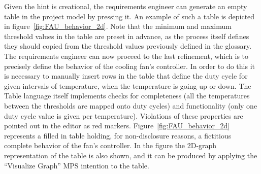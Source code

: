 Given the hint is creational, the requirements engineer can generate an empty
table in the project model by pressing it. An example of such a table is
depicted in figure~\ref{fig:FAU_behavior_2d}.
Note that the minimum and maximum threshold values in the table are preset in
advance, as the process itself defines they should copied from the threshold values previously defined in the glossary.
The requirements engineer can now proceed to the last refinement, which is to
precisely define the behavior of the cooling fan's controller. In order to do
this it is necessary to manually insert rows in the table that define the duty cycle for
given intervals of temperature, when the temperature is going up or down. 
The \textsf{Table} language itself implements checks for completeness (all the
temperatures between the thresholds are mapped onto duty cycles) and
functionality (only one duty cycle value is given per temperature). Violations
of these properties are pointed out in the editor as red markers.
Figure~\ref{fig:FAU_behavior_2d} represents a filled in table holding, for
non-disclosure reasons, a fictitious complete behavior of the fan's controller.
In the figure the 2D-graph representation of the table is also shown, and it can
be produced by applying the “Visualize Graph” MPS intention to the table.

